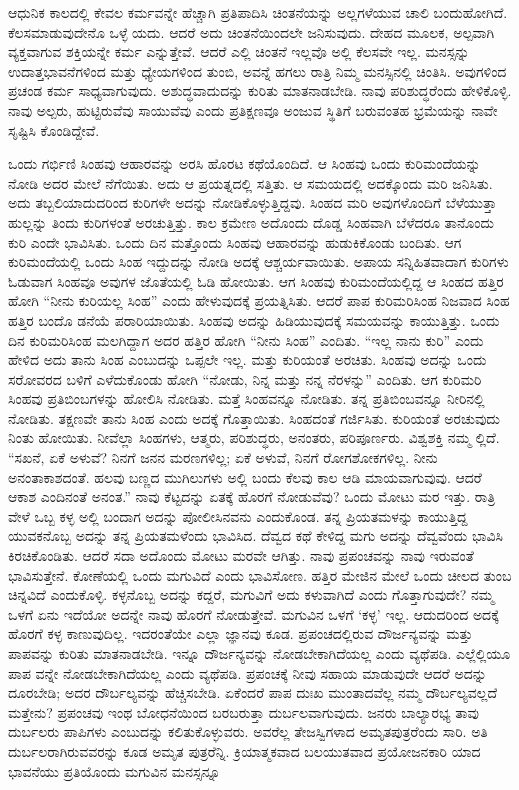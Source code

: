 ಆಧುನಿಕ ಕಾಲದಲ್ಲಿ ಕೇವಲ ಕರ್ಮವನ್ನೇ ಹೆಚ್ಚಾಗಿ ಪ್ರತಿಪಾದಿಸಿ ಚಿಂತನೆಯನ್ನು ಅಲ್ಲಗಳೆಯುವ ಚಾಲಿ ಬಂದುಹೋಗಿದೆ. ಕೆಲಸಮಾಡುವುದೇನೊ ಒಳ್ಳೆ ಯದು. ಆದರೆ ಅದು ಚಿಂತನೆಯಿಂದಲೇ ಜನಿಸುವುದು. ದೇಹದ ಮೂಲಕ, ಅಲ್ಪವಾಗಿ ವ್ಯಕ್ತವಾಗುವ ಶಕ್ತಿಯನ್ನೇ ಕರ್ಮ ಎನ್ನುತ್ತೇವೆ. ಆದರೆ ಎಲ್ಲಿ ಚಿಂತನೆ ಇಲ್ಲವೊ ಅಲ್ಲಿ ಕೆಲಸವೇ ಇಲ್ಲ. ಮನಸ್ಸನ್ನು ಉದಾತ್ತಭಾವನೆಗಳಿಂದ ಮತ್ತು ಧ್ಯೇಯಗಳಿಂದ ತುಂಬಿ, ಅವನ್ನೆ ಹಗಲು ರಾತ್ರಿ ನಿಮ್ಮ ಮನಸ್ಸಿನಲ್ಲಿ ಚಿಂತಿಸಿ. ಅವುಗಳಿಂದ ಪ್ರಚಂಡ ಕರ್ಮ ಸಾಧ್ಯವಾಗುವುದು. ಅಶುದ್ಧವಾದುದನ್ನು ಕುರಿತು ಮಾತನಾಡಬೇಡಿ. ನಾವು ಪರಿಶುದ್ಧರೆಂದು ಹೇಳಿಕೊಳ್ಳಿ. ನಾವು ಅಲ್ಪರು, ಹುಟ್ಟಿರುವೆವು ಸಾಯುವೆವು ಎಂದು ಪ್ರತಿಕ್ಷಣವೂ ಅಂಜುವ ಸ್ಥಿತಿಗೆ ಬರುವಂತಹ ಭ್ರಮೆಯನ್ನು ನಾವೇ ಸೃಷ್ಟಿಸಿ ಕೊಂಡಿದ್ದೇವೆ.

ಒಂದು ಗರ್ಭಿಣಿ ಸಿಂಹವು ಆಹಾರವನ್ನು ಅರಸಿ ಹೊರಟ ಕಥೆಯೊಂದಿದೆ. ಆ ಸಿಂಹವು ಒಂದು ಕುರಿಮಂದೆಯನ್ನು ನೋಡಿ ಅದರ ಮೇಲೆ ನೆಗೆಯಿತು. ಅದು ಆ ಪ್ರಯತ್ನದಲ್ಲಿ ಸತ್ತಿತು. ಆ ಸಮಯದಲ್ಲಿ ಅದಕ್ಕೊಂದು ಮರಿ ಜನಿಸಿತು. ಅದು ತಬ್ಬಲಿಯಾದುದರಿಂದ ಕುರಿಗಳೇ ಅದನ್ನು ನೋಡಿಕೊಳ್ಳುತ್ತಿದ್ದವು. ಸಿಂಹದ ಮರಿ ಅವುಗಳೊಂದಿಗೆ ಬೆಳೆಯುತ್ತಾ ಹುಲ್ಲನ್ನು ತಿಂದು ಕುರಿಗಳಂತೆ ಅರಚುತ್ತಿತ್ತು. ಕಾಲ ಕ್ರಮೇಣ ಅದೊಂದು ದೊಡ್ಡ ಸಿಂಹವಾಗಿ ಬೆಳೆದರೂ ತಾನೊಂದು ಕುರಿ ಎಂದೇ ಭಾವಿಸಿತು. ಒಂದು ದಿನ ಮತ್ತೊಂದು ಸಿಂಹವು ಆಹಾರವನ್ನು ಹುಡುಕಿಕೊಂಡು ಬಂದಿತು. ಆಗ ಕುರಿಮಂದೆಯಲ್ಲಿ ಒಂದು ಸಿಂಹ ಇದ್ದುದನ್ನು ನೋಡಿ ಅದಕ್ಕೆ ಆಶ್ಚರ್ಯವಾಯಿತು. ಅಪಾಯ ಸನ್ನಿಹಿತವಾದಾಗ ಕುರಿಗಳು ಓಡುವಾಗ ಸಿಂಹವೂ ಅವುಗಳ ಜೊತೆಯಲ್ಲಿ ಓಡಿ ಹೋಯಿತು. ಆಗ ಸಿಂಹವು ಕುರಿಮಂದೆಯಲ್ಲಿದ್ದ ಆ ಸಿಂಹದ ಹತ್ತಿರ ಹೋಗಿ “ನೀನು ಕುರಿಯಲ್ಲ ಸಿಂಹ” ಎಂದು ಹೇಳುವುದಕ್ಕೆ ಪ್ರಯತ್ನಿಸಿತು. ಆದರೆ ಪಾಪ ಕುರಿಮರಿಸಿಂಹ ನಿಜವಾದ ಸಿಂಹ ಹತ್ತಿರ ಬಂದೊ ಡನೆಯೆ ಪರಾರಿಯಾಯಿತು. ಸಿಂಹವು ಅದನ್ನು ಹಿಡಿಯುವುದಕ್ಕೆ ಸಮಯವನ್ನು ಕಾಯುತ್ತಿತ್ತು. ಒಂದು ದಿನ ಕುರಿಮರಿಸಿಂಹ ಮಲಗಿದ್ದಾಗ ಅದರ ಹತ್ತಿರ ಹೋಗಿ “ನೀನು ಸಿಂಹ” ಎಂದಿತು. “ಇಲ್ಲ ನಾನು ಕುರಿ” ಎಂದು ಹೇಳಿದ ಅದು ತಾನು ಸಿಂಹ ಎಂಬುದನ್ನು ಒಪ್ಪಲೇ ಇಲ್ಲ. ಮತ್ತು ಕುರಿಯಂತೆ ಅರಚಿತು. ಸಿಂಹವು ಅದನ್ನು ಒಂದು ಸರೋವರದ ಬಳಿಗೆ ಎಳೆದುಕೊಂಡು ಹೋಗಿ “ನೋಡು, ನಿನ್ನ ಮತ್ತು ನನ್ನ ನೆರಳನ್ನು” ಎಂದಿತು. ಆಗ ಕುರಿಮರಿ ಸಿಂಹವು ಪ್ರತಿಬಿಂಬಗಳನ್ನು ಹೋಲಿಸಿ ನೋಡಿತು. ಮತ್ತೆ ಸಿಂಹವನ್ನೂ ನೋಡಿತು. ತನ್ನ ಪ್ರತಿಬಿಂಬವನ್ನೂ ನೀರಿನಲ್ಲಿ ನೋಡಿತು. ತಕ್ಷಣವೇ ತಾನು ಸಿಂಹ ಎಂದು ಅದಕ್ಕೆ ಗೊತ್ತಾಯಿತು. ಸಿಂಹದಂತೆ ಗರ್ಜಿಸಿತು. ಕುರಿಯಂತೆ ಅರಚುವುದು ನಿಂತು ಹೋಯಿತು. ನೀವೆಲ್ಲಾ ಸಿಂಹಗಳು, ಆತ್ಮರು, ಪರಿಶುದ್ಧರು, ಅನಂತರು, ಪರಿಪೂರ್ಣರು. ವಿಶ್ವಶಕ್ತಿ ನಮ್ಮ ಲ್ಲಿದೆ. “ಸಖನೆ, ಏಕೆ ಅಳುವೆ? ನಿನಗೆ ಜನನ ಮರಣಗಳಿಲ್ಲ; ಏಕೆ ಅಳುವೆ, ನಿನಗೆ ರೋಗಶೋಕಗಳಿಲ್ಲ. ನೀನು ಅನಂತಾಕಾಶದಂತೆ. ಹಲವು ಬಣ್ಣದ ಮುಗಿಲುಗಳು ಅಲ್ಲಿ ಬಂದು ಕೆಲವು ಕಾಲ ಆಡಿ ಮಾಯವಾಗುವುವು. ಆದರೆ ಆಕಾಶ ಎಂದಿನಂತೆ ಅನಂತ.” ನಾವು ಕೆಟ್ಟದನ್ನು ಏತಕ್ಕೆ ಹೊರಗೆ ನೋಡುವೆವು? ಒಂದು ಮೋಟು ಮರ ಇತ್ತು. ರಾತ್ರಿ ವೇಳೆ ಒಬ್ಬ ಕಳ್ಳ ಅಲ್ಲಿ ಬಂದಾಗ ಅದನ್ನು ಪೋಲೀಸಿನವನು ಎಂದುಕೊಂಡ. ತನ್ನ ಪ್ರಿಯತಮಳನ್ನು ಕಾಯುತ್ತಿದ್ದ ಯುವಕನೊಬ್ಬ ಅದನ್ನು ತನ್ನ ಪ್ರಿಯತಮಳೆಂದು ಭಾವಿಸಿದ. ದೆವ್ವದ ಕಥೆ ಕೇಳಿದ್ದ ಮಗು ಅದನ್ನು ದೆವ್ವವೆಂದು ಭಾವಿಸಿ ಕಿರಚಿಕೊಂಡಿತು. ಆದರೆ ಸದಾ ಅದೊಂದು ಮೋಟು ಮರವೇ ಆಗಿತ್ತು. ನಾವು ಪ್ರಪಂಚವನ್ನು ನಾವು ಇರುವಂತೆ ಭಾವಿಸುತ್ತೇನೆ. ಕೋಣೆಯಲ್ಲಿ ಒಂದು ಮಗುವಿದೆ ಎಂದು ಭಾವಿಸೋಣ. ಹತ್ತಿರ ಮೇಜಿನ ಮೇಲೆ ಒಂದು ಚೀಲದ ತುಂಬ ಚಿನ್ನವಿದೆ ಎಂದುಕೊಳ್ಳಿ. ಕಳ್ಳನೊಬ್ಬ ಅದನ್ನು ಕದ್ದರೆ, ಮಗುವಿಗೆ ಅದು ಕಳುವಾಗಿದೆ ಎಂದು ಗೊತ್ತಾಗುವುದೇ? ನಮ್ಮ ಒಳಗೆ ಏನು ಇದೆಯೋ ಅದನ್ನೇ ನಾವು ಹೊರಗೆ ನೋಡುತ್ತೇವೆ. ಮಗುವಿನ ಒಳಗೆ ‘ಕಳ್ಳ’ ಇಲ್ಲ. ಆದುದರಿಂದ ಅದಕ್ಕೆ ಹೊರಗೆ ಕಳ್ಳ ಕಾಣುವುದಿಲ್ಲ. ಇದರಂತೆಯೇ ಎಲ್ಲಾ ಜ್ಞಾನವು ಕೂಡ. ಪ್ರಪಂಚದಲ್ಲಿರುವ ದೌರ್ಜನ್ಯವನ್ನು ಮತ್ತು ಪಾಪವನ್ನು ಕುರಿತು ಮಾತನಾಡಬೇಡಿ. ಇನ್ನೂ ದೌರ್ಜನ್ಯವನ್ನು ನೋಡಬೇಕಾಗಿದೆಯಲ್ಲ ಎಂದು ವ್ಯಥೆಪಡಿ. ಎಲ್ಲೆಲ್ಲಿಯೂ ಪಾಪ ವನ್ನೇ ನೋಡಬೇಕಾಗಿದೆಯಲ್ಲ ಎಂದು ವ್ಯಥೆಪಡಿ. ಪ್ರಪಂಚಕ್ಕೆ ನೀವು ಸಹಾಯ ಮಾಡುವುದೇ ಆದರೆ ಅದನ್ನು ದೂರಬೇಡಿ; ಅದರ ದೌರ್ಬಲ್ಯವನ್ನು ಹೆಚ್ಚಿಸಬೇಡಿ. ಏಕೆಂದರೆ ಪಾಪ ದುಃಖ ಮುಂತಾದವೆಲ್ಲ ನಮ್ಮ ದೌರ್ಬಲ್ಯವಲ್ಲದೆ ಮತ್ತೇನು? ಪ್ರಪಂಚವು ಇಂಥ ಬೋಧನೆಯಿಂದ ಬರಬರುತ್ತಾ ದುರ್ಬಲವಾಗುವುದು. ಜನರು ಬಾಲ್ಯಾರಭ್ಯ ತಾವು ದುರ್ಬಲರು ಪಾಪಿಗಳು ಎಂಬುದನ್ನು ಕಲಿತುಕೊಳ್ಳುವರು. ಅವರೆಲ್ಲ ತೇಜಸ್ವಿಗಳಾದ ಅಮೃತಪುತ್ರರೆಂದು ಸಾರಿ. ಅತಿ ದುರ್ಬಲರಾಗಿರುವವರನ್ನು ಕೂಡ ಅಮೃತ ಪುತ್ರರೆನ್ನಿ. ಕ್ರಿಯಾತ್ಮಕವಾದ ಬಲಯುತವಾದ ಪ್ರಯೋಜನಕಾರಿ ಯಾದ ಭಾವನೆಯು ಪ್ರತಿಯೊಂದು ಮಗುವಿನ ಮನಸ್ಸನ್ನೂ 